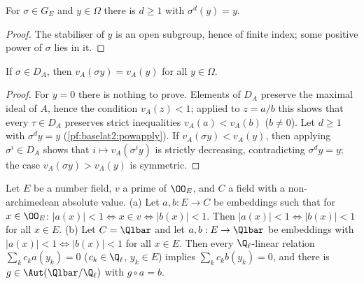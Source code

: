 \begin{lemma}\label{pf:baselat2:powapply}
For $\sigma\in G_E$ and $y\in\Omega$ there is $d\ge1$ with $\sigma^d(y)=y$.
\end{lemma}

\begin{proof}
The stabiliser of $y$ is an open subgroup, hence of finite index; some positive power of $\sigma$ lies in it.
\end{proof}

\begin{lemma}\label{pf:baselat2:valapply}
If $\sigma\in D_A$, then $v_A(\sigma y)=v_A(y)$ for all $y\in\Omega$.
\end{lemma}

\begin{proof}
For $y=0$ there is nothing to prove. Elements of $D_A$ preserve the maximal ideal of $A$, hence the condition
$v_A(z)<1$; applied to $z=a/b$ this shows that every $\tau\in D_A$ preserves strict inequalities
$v_A(a)<v_A(b)$ ($b\ne0$). Let $d\ge1$ with $\sigma^d y=y$ (\cref{pf:baselat2:powapply}). If $v_A(\sigma y)<v_A(y)$, then
applying $\sigma^i\in D_A$ shows that $i\mapsto v_A(\sigma^iy)$ is strictly decreasing, contradicting $\sigma^dy=y$; the
case $v_A(\sigma y)>v_A(y)$ is symmetric.
\end{proof}

\begin{lemma}\label{pf:baselat2:embcompl}
Let $E$ be a number field, $v$ a prime of $\OO_E$, and $C$ a field with a non-archimedean absolute value.
\textup{(a)} Let $a,b:E\to C$ be embeddings such that for $x\in\OO_E$: $|a(x)|<1\iff x\in v\iff|b(x)|<1$. Then
$|a(x)|<1\iff|b(x)|<1$ for all $x\in E$.
\textup{(b)} Let $C=\Qlbar$ and let $a,b:E\to\Qlbar$ be embeddings with $|a(x)|<1\iff|b(x)|<1$ for all $x\in E$. Then
every $\Q_\ell$-linear relation $\sum_kc_ka(y_k)=0$ ($c_k\in\Q_\ell$, $y_k\in E$) implies $\sum_kc_kb(y_k)=0$, and there is
$g\in\Aut(\Qlbar/\Q_\ell)$ with $g\circ a=b$.
\end{lemma}

